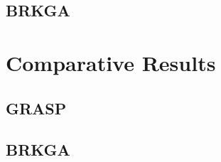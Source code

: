\documentclass{article}
\begin{document}
	\subsection{BRKGA}
	\section{Comparative Results}
	\subsection{GRASP}
	\subsection{BRKGA}
\end{document}
